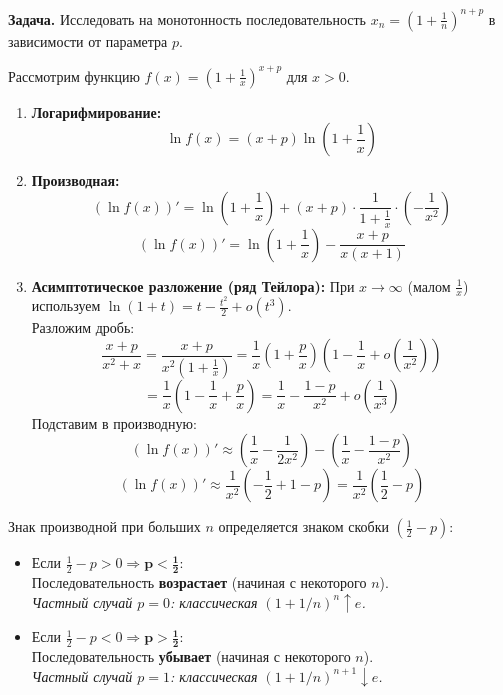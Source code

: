 \textbf{Задача.} Исследовать на монотонность последовательность $x_n = \left(1+\frac{1}{n}\right)^{n+p}$ в зависимости от параметра $p$.

\begin{tcolorbox}[title=Анализ монотонности]
	Рассмотрим функцию $f(x) = \left(1+\frac{1}{x}\right)^{x+p}$ для $x > 0$.
	\begin{enumerate}
		\item \textbf{Логарифмирование:}
			$$ \ln f(x) = (x+p) \ln\left(1+\frac{1}{x}\right) $$
		\item \textbf{Производная:}
			$$ (\ln f(x))' = \ln\left(1+\frac{1}{x}\right) + (x+p) \cdot \frac{1}{1+\frac{1}{x}} \cdot \left(-\frac{1}{x^2}\right) $$
			$$ (\ln f(x))' = \ln\left(1+\frac{1}{x}\right) - \frac{x+p}{x(x+1)} $$
		\item \textbf{Асимптотическое разложение (ряд Тейлора):}
			При $x \to \infty$ (малом $\frac{1}{x}$) используем $\ln(1+t) = t - \frac{t^2}{2} + o(t^3)$.\\
			Разложим дробь:
			$$ \frac{x+p}{x^2+x} = \frac{x+p}{x^2(1+\frac{1}{x})} = \frac{1}{x}\left(1+\frac{p}{x}\right)\left(1-\frac{1}{x} + o\left(\frac{1}{x^2}\right)\right) $$
			$$ = \frac{1}{x}\left(1 - \frac{1}{x} + \frac{p}{x}\right) = \frac{1}{x} - \frac{1-p}{x^2} + o\left(\frac{1}{x^3}\right) $$
			Подставим в производную:
			$$ (\ln f(x))' \approx \left(\frac{1}{x} - \frac{1}{2x^2}\right) - \left(\frac{1}{x} - \frac{1-p}{x^2}\right) $$
			$$ (\ln f(x))' \approx \frac{1}{x^2} \left(-\frac{1}{2} + 1 - p\right) = \frac{1}{x^2}\left(\frac{1}{2} - p\right) $$
	\end{enumerate}
\end{tcolorbox}

\begin{tcolorbox}[title=Выводы о монотонности]
	Знак производной при больших $n$ определяется знаком скобки $\left(\frac{1}{2} - p\right)$:
	\begin{itemize}
		\item Если $\frac{1}{2} - p > 0 \Rightarrow \mathbf{p < \frac{1}{2}}$:\\
			Последовательность \textbf{возрастает} (начиная с некоторого $n$).\\
			\textit{Частный случай $p=0$: классическая $(1+1/n)^n \uparrow e$.}
		\item Если $\frac{1}{2} - p < 0 \Rightarrow \mathbf{p > \frac{1}{2}}$:\\
			Последовательность \textbf{убывает} (начиная с некоторого $n$).\\
			\textit{Частный случай $p=1$: классическая $(1+1/n)^{n+1} \downarrow e$.}
	\end{itemize}
\end{tcolorbox}

